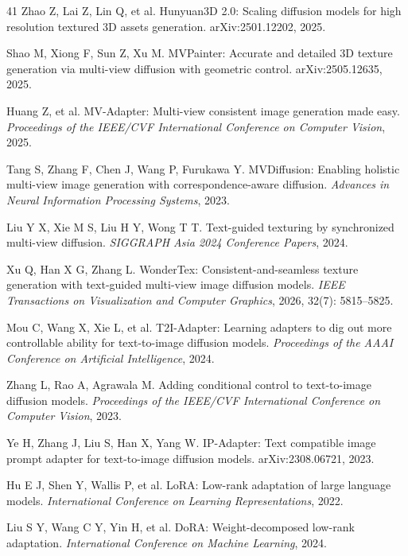 \documentclass[times,twocolumn,final]{elsarticle}
\begin{document}
\begin{thebibliography}{41}
Zhao Z, Lai Z, Lin Q, et al. Hunyuan3D 2.0: Scaling diffusion models for high resolution textured 3D assets generation. arXiv:2501.12202, 2025.

Shao M, Xiong F, Sun Z, Xu M. MVPainter: Accurate and detailed 3D texture generation via multi-view diffusion with geometric control. arXiv:2505.12635, 2025.

Huang Z, et al. MV-Adapter: Multi-view consistent image generation made easy. \textit{Proceedings of the IEEE/CVF International Conference on Computer Vision}, 2025.

Tang S, Zhang F, Chen J, Wang P, Furukawa Y. MVDiffusion: Enabling holistic multi-view image generation with correspondence-aware diffusion. \textit{Advances in Neural Information Processing Systems}, 2023.

Liu Y X, Xie M S, Liu H Y, Wong T T. Text-guided texturing by synchronized multi-view diffusion. \textit{SIGGRAPH Asia 2024 Conference Papers}, 2024.

Xu Q, Han X G, Zhang L. WonderTex: Consistent-and-seamless texture generation with text-guided multi-view image diffusion models. \textit{IEEE Transactions on Visualization and Computer Graphics}, 2026, 32(7): 5815--5825.

Mou C, Wang X, Xie L, et al. T2I-Adapter: Learning adapters to dig out more controllable ability for text-to-image diffusion models. \textit{Proceedings of the AAAI Conference on Artificial Intelligence}, 2024.

Zhang L, Rao A, Agrawala M. Adding conditional control to text-to-image diffusion models. \textit{Proceedings of the IEEE/CVF International Conference on Computer Vision}, 2023.

Ye H, Zhang J, Liu S, Han X, Yang W. IP-Adapter: Text compatible image prompt adapter for text-to-image diffusion models. arXiv:2308.06721, 2023.

Hu E J, Shen Y, Wallis P, et al. LoRA: Low-rank adaptation of large language models. \textit{International Conference on Learning Representations}, 2022.

Liu S Y, Wang C Y, Yin H, et al. DoRA: Weight-decomposed low-rank adaptation. \textit{International Conference on Machine Learning}, 2024.


\end{thebibliography}
\end{document}
